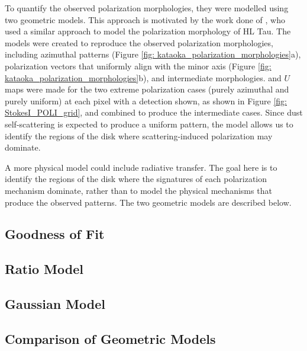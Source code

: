 

To quantify the observed polarization morphologies, they were modelled using two geometric models. This approach is motivated by the work done of \cite{Stephens_2017}, who used a similar approach to model the polarization morphology of HL Tau. The models were created to reproduce the observed polarization morphologies, including azimuthal patterns (Figure \ref{fig: kataoka_polarization_morphologies}a), polarization vectors that uniformly align with the minor axis (Figure \ref{fig: kataoka_polarization_morphologies}b), and intermediate morphologies. \SQ and $U$ maps were made for the two extreme polarization cases (purely azimuthal and purely uniform) at each pixel with a detection shown, as shown in Figure \ref{fig: StokesI_POLI_grid}, and combined to produce the intermediate cases. Since dust self-scattering is expected to produce a uniform pattern, the model allows us to identify the regions of the disk where scattering-induced polarization may dominate. 

A more physical model could include radiative transfer. The goal here is to identify the regions of the disk where the signatures of each polarization mechanism dominate, rather than to model the physical mechanisms that produce the observed patterns. The two geometric models are described below.



\subsection{Goodness of Fit}


\subsection{Ratio Model}




\subsection{Gaussian Model}








\subsection{Comparison of Geometric Models}



